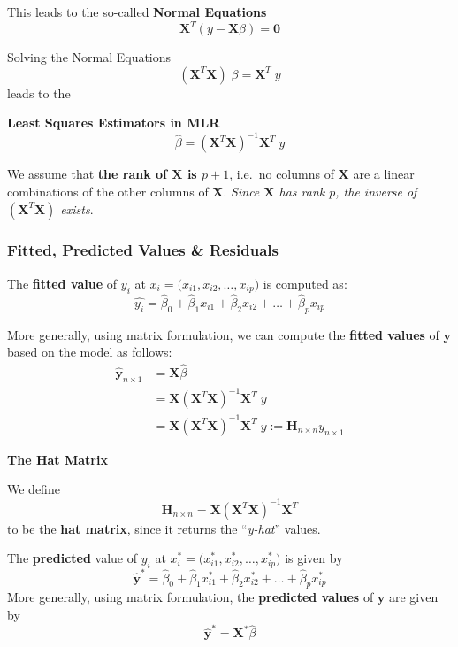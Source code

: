 \documentclass[
]{book}
\begin{document}
This leads to the so-called \textbf{Normal Equations}
\[\mathbf{X}^T (y - \mathbf{X}\beta) = \mathbf{0}\]

Solving the Normal Equations
\[(\mathbf{X}^T\mathbf{X})\;\beta  = \mathbf{X}^T\; y  \]
leads to the

\textbf{Least Squares Estimators in MLR}
\[\hat{\beta} = (\mathbf{X}^T\mathbf{X})^{-1} \mathbf{X}^T\; y\]

We assume that \textbf{the rank of \(\mathbf{X}\) is \(p+1\)}, i.e.~no columns of \(\mathbf{X}\) are a linear combinations of the other columns of \(\mathbf{X}\). \emph{Since \(\mathbf{X}\) has rank \(p\), the inverse of \((\mathbf{X}^T\mathbf{X})\) exists}.

\subsubsection*{Fitted, Predicted Values \& Residuals}\label{fitted-predicted-values-residuals}

The \textbf{fitted value} of \(y_i\) at \(x_i = \bigl( x_{i1}, x_{i2}, \ldots , x_{ip}\bigr)\) is computed as:
\[\hat{y_{i}} = \hat{\beta}_0 + \hat{\beta}_1 x_{i1}+ \hat{\beta}_2 x_{i2} + \ldots + \hat{\beta}_p x_{ip}\]

More generally, using matrix formulation, we can compute the \textbf{fitted values} of \(\mathbf{y}\) based on the model as follows:
\begin{align*}
\hat{\mathbf{y}}_{n\times 1} &= \mathbf{X}  \hat{\beta} \\
&= \mathbf{X}  (\mathbf{X}^T\mathbf{X})^{-1} \mathbf{X}^T\; y\\
&=  \mathbf{X}  (\mathbf{X}^T\mathbf{X})^{-1} \mathbf{X}^T\; y := \mathbf{H}_{n \times n} y_{n\times 1}
\end{align*}

\textbf{The Hat Matrix}

We define
\[ \mathbf{H}_{n \times n} =  \mathbf{X}  (\mathbf{X}^T\mathbf{X})^{-1} \mathbf{X}^T\]
to be the \textbf{hat matrix}, since it returns the ``\emph{y-hat}'' values.

The \textbf{predicted} value of \(y_i\) at \(x_i^* = \bigl( x_{i1}^*, x_{i2}^*, \ldots , x_{ip}^*\bigr)\) is given by
\[\hat{\mathbf{y}}^* = \hat{\beta}_0 + \hat{\beta}_1 x_{i1}^* + \hat{\beta}_2 x_{i2}^* + \ldots + \hat{\beta}_p x_{ip}^*\]
More generally, using matrix formulation, the \textbf{predicted values} of \(\mathbf{y}\) are given by
\[\hat{\mathbf{y}}^* = \mathbf{X}^* \hat{\beta}\]
\end{document}
